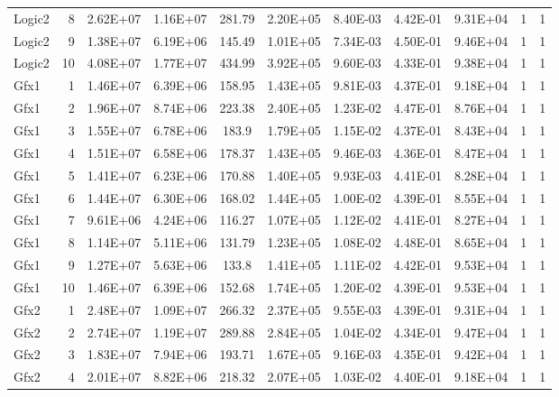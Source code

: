 \begin{longtable}{@{}l!{\vrule}r!{\vrule}c!{\vrule}c!{\vrule}c!{\vrule}c!{\vrule}c!{\vrule}c!{\vrule}c!{\vrule}c!{\vrule}c@{}}
Logic2 & 8 & 2.62E+07 & 1.16E+07 & 281.79 & 2.20E+05 & 8.40E-03 & 4.42E-01 & 9.31E+04 & 1 & 1 \\
Logic2 & 9 & 1.38E+07 & 6.19E+06 & 145.49 & 1.01E+05 & 7.34E-03 & 4.50E-01 & 9.46E+04 & 1 & 1 \\
Logic2 & 10 & 4.08E+07 & 1.77E+07 & 434.99 & 3.92E+05 & 9.60E-03 & 4.33E-01 & 9.38E+04 & 1 & 1 \\
\hline
{}
Gfx1 & 1 & 1.46E+07 & 6.39E+06 & 158.95 & 1.43E+05 & 9.81E-03 & 4.37E-01 & 9.18E+04 & 1 & 1 \\
Gfx1 & 2 & 1.96E+07 & 8.74E+06 & 223.38 & 2.40E+05 & 1.23E-02 & 4.47E-01 & 8.76E+04 & 1 & 1 \\
Gfx1 & 3 & 1.55E+07 & 6.78E+06 & 183.9 & 1.79E+05 & 1.15E-02 & 4.37E-01 & 8.43E+04 & 1 & 1 \\
Gfx1 & 4 & 1.51E+07 & 6.58E+06 & 178.37 & 1.43E+05 & 9.46E-03 & 4.36E-01 & 8.47E+04 & 1 & 1 \\
Gfx1 & 5 & 1.41E+07 & 6.23E+06 & 170.88 & 1.40E+05 & 9.93E-03 & 4.41E-01 & 8.28E+04 & 1 & 1 \\
Gfx1 & 6 & 1.44E+07 & 6.30E+06 & 168.02 & 1.44E+05 & 1.00E-02 & 4.39E-01 & 8.55E+04 & 1 & 1 \\
Gfx1 & 7 & 9.61E+06 & 4.24E+06 & 116.27 & 1.07E+05 & 1.12E-02 & 4.41E-01 & 8.27E+04 & 1 & 1 \\
Gfx1 & 8 & 1.14E+07 & 5.11E+06 & 131.79 & 1.23E+05 & 1.08E-02 & 4.48E-01 & 8.65E+04 & 1 & 1 \\
Gfx1 & 9 & 1.27E+07 & 5.63E+06 & 133.8 & 1.41E+05 & 1.11E-02 & 4.42E-01 & 9.53E+04 & 1 & 1 \\
Gfx1 & 10 & 1.46E+07 & 6.39E+06 & 152.68 & 1.74E+05 & 1.20E-02 & 4.39E-01 & 9.53E+04 & 1 & 1 \\
\hline
Gfx2 & 1 & 2.48E+07 & 1.09E+07 & 266.32 & 2.37E+05 & 9.55E-03 & 4.39E-01 & 9.31E+04 & 1 & 1 \\
Gfx2 & 2 & 2.74E+07 & 1.19E+07 & 289.88 & 2.84E+05 & 1.04E-02 & 4.34E-01 & 9.47E+04 & 1 & 1 \\
Gfx2 & 3 & 1.83E+07 & 7.94E+06 & 193.71 & 1.67E+05 & 9.16E-03 & 4.35E-01 & 9.42E+04 & 1 & 1 \\
Gfx2 & 4 & 2.01E+07 & 8.82E+06 & 218.32 & 2.07E+05 & 1.03E-02 & 4.40E-01 & 9.18E+04 & 1 & 1 \\

\end{longtable}
